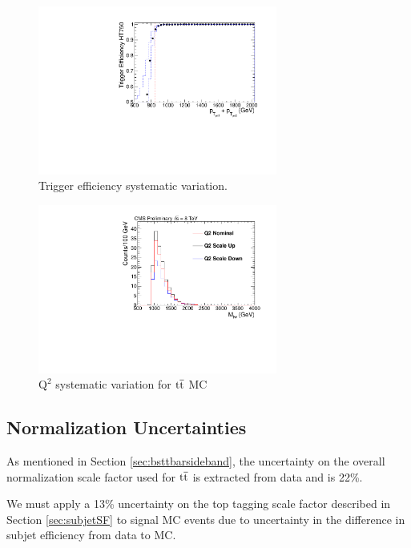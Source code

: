 \begin{figure}[htcb]
\begin{center}
\includegraphics[width=0.7\textwidth]{AN-14-049/figs/Trigger_Comparison_Htdijet_dataonly_withsyst}
\caption{
Trigger efficiency systematic variation. 
}
\label{figs:bsteffsys}
\end{center}
\end{figure}


\begin{figure}[htcb]
\begin{center}
\includegraphics[width=0.7\textwidth]{AN-14-049/figs/TTbar_Q2Scale}
\caption{
$\mathrm{Q^2}$ systematic variation for $\mathrm{t\overline{t}}$ MC 
}
\label{figs:bsq2scale}
\end{center}
\end{figure}


\subsection{Normalization Uncertainties}
As mentioned in Section \ref{sec:bsttbarsideband}, the uncertainty on the overall normalization scale factor used for $\mathrm{t\overline{t}}$ is extracted from data and is 22\%.   

We must apply a 13\% uncertainty on the top tagging scale factor described in Section \ref{sec:subjetSF} 
to signal MC events due to uncertainty in the difference in subjet efficiency from data to MC.

